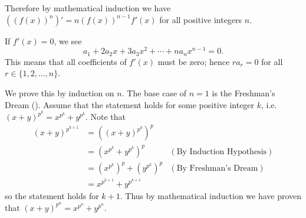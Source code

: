 \begin{questions}
    Therefore by mathematical induction we have $((f(x))^n)' = n(f(x))^{n-1}f'(x)$ for all positive integers $n$.

    \item If $f'(x) = 0$, we see
    \[
        a_1 + 2a_2x + 3a_3x^2 + \cdots + na_nx^{n-1} = 0.
    \]
    This means that all coefficients of $f'(x)$ must be zero; hence $ra_r = 0$ for all $r \in \{1, 2, \dots, n\}$.

    \item We prove this by induction on $n$. The base case of $n = 1$ is the Freshman's Dream (). Assume that the statement holds for some positive integer $k$, i.e. $(x+y)^{p^k} = x^{p^k} + y^{p^k}$. Note that
    \begin{align*}
        (x+y)^{p^{k+1}} &= \left((x+y)^{p^k}\right)^p\\
        &= (x^{p^k}+y^{p^k})^p & (\text{By Induction Hypothesis})\\
        &= \left(x^{p^k}\right)^p + \left(y^{p^k}\right)^p & (\text{By Freshman's Dream})\\
        &= x^{p^{k+1}} + y^{p^{k+1}}
    \end{align*}
    so the statement holds for $k + 1$. Thus by mathematical induction we have proven that $(x+y)^{p^n} = x^{p^n} + y^{p^n}$.
\end{questions}
